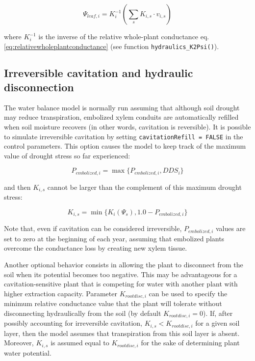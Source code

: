\documentclass[]{book}
\begin{document}
\begin{equation}
\Psi_{leaf,i}= K_i^{-1}\left(\sum_{s}{K_{i,s}\cdot v_{i,s}}\right)
\end{equation}

where \(K_i^{-1}\) is the inverse of the relative whole-plant
conductance eq. \eqref{eq:relativewholeplantconductance} (see function
\texttt{hydraulics\_K2Psi()}).

\subsection{Irreversible cavitation and hydraulic
disconnection}\label{irreversible-cavitation-and-hydraulic-disconnection}

The water balance model is normally run assuming that although soil
drought may reduce transpiration, embolized xylem conduits are
automatically refilled when soil moisture recovers (in other words,
cavitation is reversible). It is possible to simulate irreversible
cavitation by setting \texttt{cavitationRefill\ =\ FALSE} in the control
parameters. This option causes the model to keep track of the maximum
value of drought stress so far experienced:

\begin{equation}
P_{embolized,i}= \max \{P_{embolized,i}, DDS_i \}
\end{equation}

and then \(K_{i,s}\) cannot be larger than the complement of this
maximum drought stress:

\begin{equation}
K_{i,s} = \min \{K_{i}(\Psi_s), 1.0 - P_{embolized,i} \}
\end{equation}

Note that, even if cavitation can be considered irreversible,
\(P_{embolized,i}\) values are set to zero at the beginning of each
year, assuming that embolized plants overcome the conductance loss by
creating new xylem tissue.

Another optional behavior consists in allowing the plant to disconnect
from the soil when its potential becomes too negative. This may be
advantageous for a cavitation-sensitive plant that is competing for
water with another plant with higher extraction capacity. Parameter
\(K_{rootdisc,i}\) can be used to specify the minimum relative
conductance value that the plant will tolerate without disconnecting
hydraulically from the soil (by default \(K_{rootdisc,i} = 0\)). If,
after possibly accounting for irreversible cavitation,
\(K_{i,s}<K_{rootdisc,i}\) for a given soil layer, then the model
assumes that transpiration from this soil layer is absent. Moreover,
\(K_{i,s}\) is assumed equal to \(K_{rootdisc,i}\) for the sake of
determining plant water potential.
\end{document}
